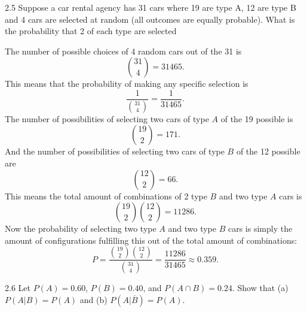 \begin{problem}{2.5}
  Suppose a car rental agency has 31 cars where 19 are type A, 12 are type B and 4 cars are selected at random (all outcomes are equally probable).
  What is the probability that 2 of each type are selected
\end{problem}

\begin{derivation}
  The number of possible choices of 4 random cars out of the 31 is
  \begin{equation*}
    \binom{31}{4} = 31465
  .\end{equation*}
  This means that the probability of making any specific selection is
  \begin{equation*}
    \frac{1}{\binom{31}{4}} = \frac{1}{31465}
  .\end{equation*}
  The number of possibilities of selecting two cars of type $A$ of the 19 possible is
  \begin{equation*}
    \binom{19}{2} = 171
  .\end{equation*}
  And the number of possibilities of selecting two cars of type $B$ of the 12 possible are
  \begin{equation*}
    \binom{12}{2} = 66
  .\end{equation*}
  This means the total amount of combinations of 2 type $B$ and two type $A$ cars is
  \begin{equation*}
    \binom{19}{2} \binom{12}{2} = 11286
  .\end{equation*}
  Now the probability of selecting two type $A$ and two type $B$ cars is simply the amount of configurations fulfilling this out of the total amount of combinations:
  \begin{equation*}
    P = \frac{\binom{19}{2} \binom{12}{2}}{\binom{31}{4}} = \frac{11286}{31465} \approx \num{0,359} 
  .\end{equation*}
\end{derivation}


\begin{problem}{2.6}
  Let $P(A) = \num{0,60}$, $P(B) = \num{0,40}$, and $P(A \cap B) = \num{0,24}$.
  Show that (a) $P(A|B) = P(A)$ and (b) $P(A | \overline{B}) = P(A)$.
\end{problem}

